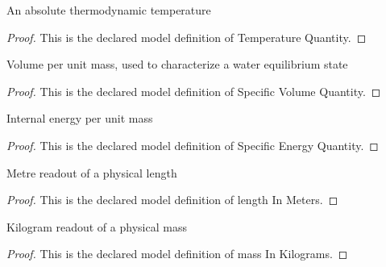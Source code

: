 \begin{definition}
  \label{def:physics:phyx-mini-0453:phyxminiproblems-problemphyxmini0453-temperaturequantity}
  An absolute thermodynamic temperature
\end{definition}
\begin{proof}
  This is the declared model definition of Temperature Quantity.
\end{proof}
\begin{definition}
  \label{def:physics:phyx-mini-0453:phyxminiproblems-problemphyxmini0453-specificvolumequantity}
  Volume per unit mass, used to characterize a water equilibrium state
\end{definition}
\begin{proof}
  This is the declared model definition of Specific Volume Quantity.
\end{proof}
\begin{definition}
  \label{def:physics:phyx-mini-0453:phyxminiproblems-problemphyxmini0453-specificenergyquantity}
  Internal energy per unit mass
\end{definition}
\begin{proof}
  This is the declared model definition of Specific Energy Quantity.
\end{proof}
\begin{definition}
  \label{def:physics:phyx-mini-0453:phyxminiproblems-problemphyxmini0453-lengthinmeters}
  Metre readout of a physical length
\end{definition}
\begin{proof}
  This is the declared model definition of length In Meters.
\end{proof}
\begin{definition}
  \label{def:physics:phyx-mini-0453:phyxminiproblems-problemphyxmini0453-massinkilograms}
  Kilogram readout of a physical mass
\end{definition}
\begin{proof}
  This is the declared model definition of mass In Kilograms.
\end{proof}
